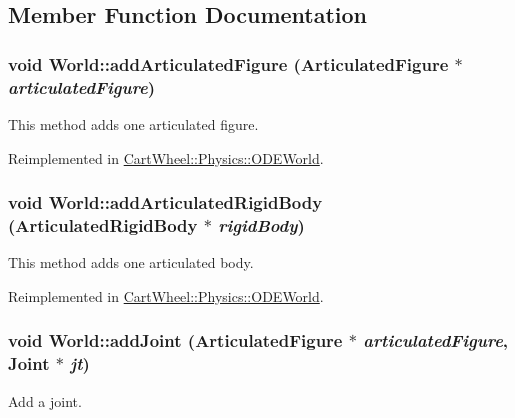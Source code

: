 \subsection{Member Function Documentation}
\hypertarget{classCartWheel_1_1Physics_1_1World_af98e74c3270d1d55dc0990be78653214}{
\subsubsection[{addArticulatedFigure}]{\setlength{\rightskip}{0pt plus 5cm}void World::addArticulatedFigure ({\bf ArticulatedFigure} $\ast$ {\em articulatedFigure})}}
\label{classCartWheel_1_1Physics_1_1World_af98e74c3270d1d55dc0990be78653214}
This method adds one articulated figure. 

Reimplemented in \hyperlink{classCartWheel_1_1Physics_1_1ODEWorld_a092b6f5911b2241c63927005b71fdf1d}{CartWheel::Physics::ODEWorld}.

\hypertarget{classCartWheel_1_1Physics_1_1World_a3804e4088fe10df5c4c08fde98bcbadc}{
\subsubsection[{addArticulatedRigidBody}]{\setlength{\rightskip}{0pt plus 5cm}void World::addArticulatedRigidBody ({\bf ArticulatedRigidBody} $\ast$ {\em rigidBody})}}
\label{classCartWheel_1_1Physics_1_1World_a3804e4088fe10df5c4c08fde98bcbadc}
This method adds one articulated body. 

Reimplemented in \hyperlink{classCartWheel_1_1Physics_1_1ODEWorld_aa68b2283efade199c6d444672afea1eb}{CartWheel::Physics::ODEWorld}.

\hypertarget{classCartWheel_1_1Physics_1_1World_a4e4033d358b1654796aa3c3463fa875a}{
\subsubsection[{addJoint}]{\setlength{\rightskip}{0pt plus 5cm}void World::addJoint ({\bf ArticulatedFigure} $\ast$ {\em articulatedFigure}, \/  {\bf Joint} $\ast$ {\em jt})}}
\label{classCartWheel_1_1Physics_1_1World_a4e4033d358b1654796aa3c3463fa875a}
Add a joint. 

